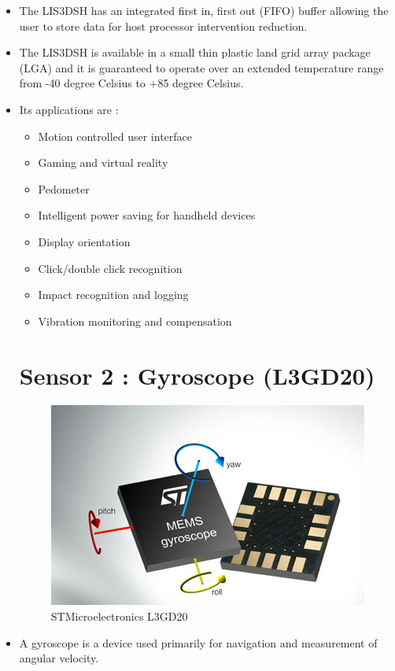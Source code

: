 \documentclass[11pt,a4paper]{article}
\begin{document}
\begin{itemize}
\item The LIS3DSH has an integrated first in, first out
(FIFO) buffer allowing the user to store data for
host processor intervention reduction.

\item The LIS3DSH is available in a small thin plastic
land grid array package (LGA) and it is
guaranteed to operate over an extended
temperature range from -40 degree Celsius to +85 degree Celsius.

\item Its applications are :
\begin{itemize}
\item Motion controlled user interface
\item Gaming and virtual reality
\item Pedometer
\item Intelligent power saving for handheld devices
\item Display orientation
\item Click/double click recognition
\item Impact recognition and logging
\item Vibration monitoring and compensation

\end{itemize}

\newpage
\section{Sensor 2 : Gyroscope (L3GD20)}

\begin{figure}[h]
    \centering
	\includegraphics[scale=0.5]{gyroscope.png}
	\caption {STMicroelectronics L3GD20}
	\end{figure}
	
\item A gyroscope is a device used primarily for navigation and measurement of angular velocity.


\end{itemize}
\end{document}
